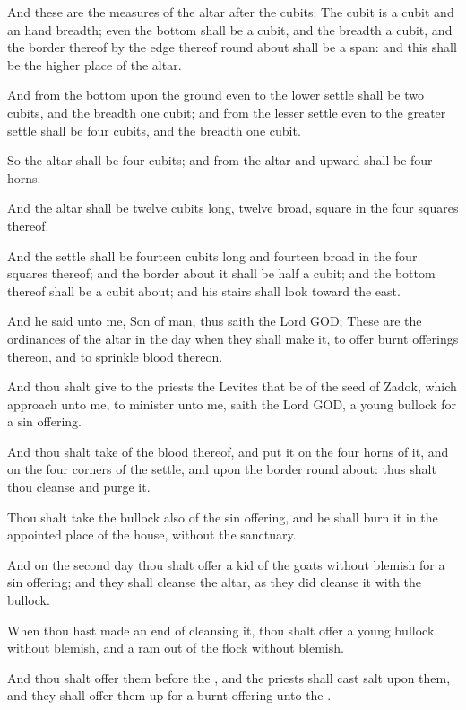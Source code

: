\Verse And these are the measures of the altar after the cubits: The cubit is a cubit and an hand breadth; even the bottom shall be a cubit, and the breadth a cubit, and the border thereof by the edge thereof round about shall be a span: and this shall be the higher place of the altar.

\Verse And from the bottom upon the ground even to the lower settle shall be two cubits, and the breadth one cubit; and from the lesser settle even to the greater settle shall be four cubits, and the breadth one cubit.

\Verse So the altar shall be four cubits; and from the altar and upward shall be four horns.

\Verse And the altar shall be twelve cubits long, twelve broad, square in the four squares thereof.

\Verse And the settle shall be fourteen cubits long and fourteen broad in the four squares thereof; and the border about it shall be half a cubit; and the bottom thereof shall be a cubit about; and his stairs shall look toward the east.

\Verse And he said unto me, Son of man, thus saith the Lord GOD; These are the ordinances of the altar in the day when they shall make it, to offer burnt offerings thereon, and to sprinkle blood thereon.

\Verse And thou shalt give to the priests the Levites that be of the seed of Zadok, which approach unto me, to minister unto me, saith the Lord GOD, a young bullock for a sin offering.

\Verse And thou shalt take of the blood thereof, and put it on the four horns of it, and on the four corners of the settle, and upon the border round about: thus shalt thou cleanse and purge it.

\Verse Thou shalt take the bullock also of the sin offering, and he shall burn it in the appointed place of the house, without the sanctuary.

\Verse And on the second day thou shalt offer a kid of the goats without blemish for a sin offering; and they shall cleanse the altar, as they did cleanse it with the bullock.

\Verse When thou hast made an end of cleansing it, thou shalt offer a young bullock without blemish, and a ram out of the flock without blemish.

\Verse And thou shalt offer them before the \LORD, and the priests shall cast salt upon them, and they shall offer them up for a burnt offering unto the \LORD.

